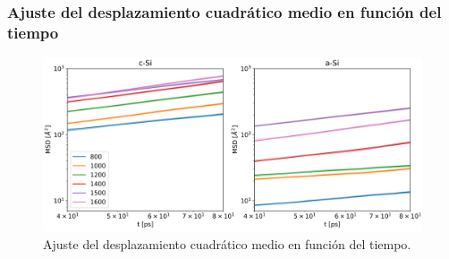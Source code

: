 \subsubsection{Ajuste del desplazamiento cuadrático medio en función del tiempo}

\begin{figure}[h!]
    \centering
    \includegraphics[width=\textwidth]{Silicio/comportamiento/resultados/traza/msd/msd.png}
    \caption{Ajuste del desplazamiento cuadrático medio en función del tiempo.}
    \label{fig:tmsd}
\end{figure}
